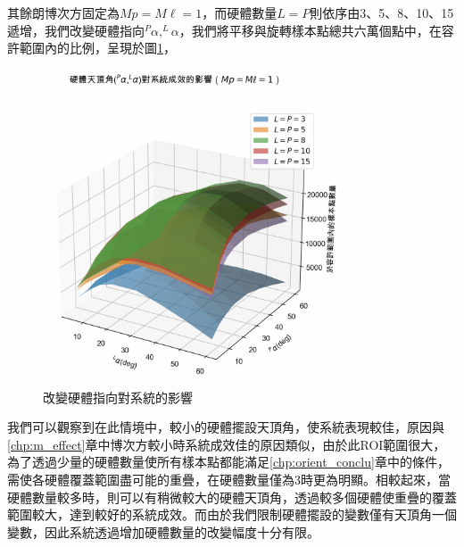 
其餘朗博次方固定為$Mp=M\ell=1$，而硬體數量$L=P$則依序由3、5、8、10、15遞增，我們改變硬體指向$^P\alpha,^L\alpha$，我們將平移與旋轉樣本點總共六萬個點中，在容許範圍內的比例，呈現於圖\ref{pic:alpha_effect}，




\begin{figure}[htpb]
    \centering
    \includegraphics[width=9cm]{ch4pic/alpha_effect.png}
    \caption{改變硬體指向對系統的影響}
    \label{pic:alpha_effect}
\end{figure}

我們可以觀察到在此情境中，較小的硬體擺設天頂角，使系統表現較佳，原因與\ref{chp:m_effect}章中博次方較小時系統成效佳的原因類似，由於此ROI範圍很大，為了透過少量的硬體數量使所有樣本點都能滿足\ref{chp:orient_conclu}章中的條件，需使各硬體覆蓋範圍盡可能的重疊，在硬體數量僅為3時更為明顯。相較起來，當硬體數量較多時，則可以有稍微較大的硬體天頂角，透過較多個硬體使重疊的覆蓋範圍較大，達到較好的系統成效。而由於我們限制硬體擺設的變數僅有天頂角一個變數，因此系統透過增加硬體數量的改變幅度十分有限。





